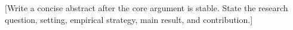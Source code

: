 [Write a concise abstract after the core argument is stable. State the research question, setting, empirical strategy, main result, and contribution.]
